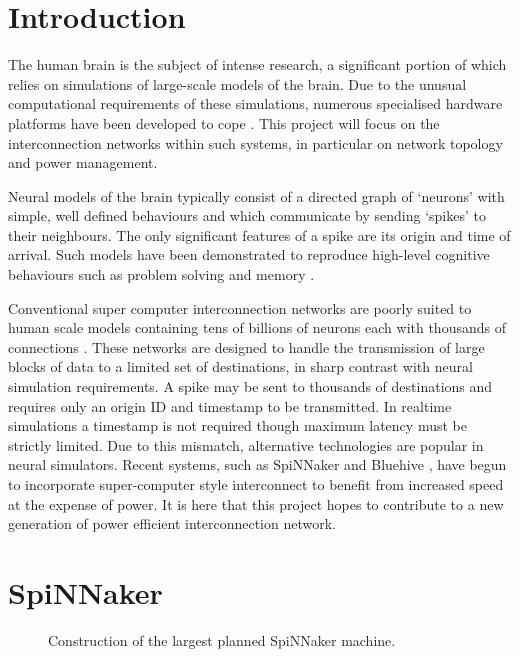 \section{Introduction}

The human brain is the subject of intense research, a significant portion of
which relies on simulations of large-scale models of the brain. Due to the
unusual computational requirements of these simulations, numerous specialised
hardware platforms have been developed to cope
\cite{furber07,moore12,maguire07,choudhary12,misra10}. This project will focus
on the interconnection networks within such systems, in particular on network
topology and power management.

Neural models of the brain typically consist of a directed graph of `neurons'
with simple, well defined behaviours and which communicate by sending `spikes'
to their neighbours. The only significant features of a spike are its origin and
time of arrival. Such models have been demonstrated to reproduce high-level
cognitive behaviours such as problem solving and memory \cite{eliasmith12}. 

Conventional super computer interconnection networks are poorly suited to human
scale models containing tens of billions of neurons \cite{williams88} each with
thousands of connections \cite{kung88}. These networks are designed to handle
the transmission of large blocks of data to a limited set of destinations, in
sharp contrast with neural simulation requirements. A spike may be sent to
thousands of destinations and requires only an origin ID and timestamp to be
transmitted. In realtime simulations a timestamp is not required though maximum
latency must be strictly limited. Due to this mismatch, alternative technologies
are popular in neural simulators. Recent systems, such as SpiNNaker
\cite{furber07} and Bluehive \cite{moore12}, have begun to incorporate
super-computer style interconnect to benefit from increased speed at the expense
of power. It is here that this project hopes to contribute to a new generation
of power efficient interconnection network.

\section{SpiNNaker}
	
	\begin{figure}
		\center
		
		
		\caption{Construction of the largest planned SpiNNaker machine.}
		\label{fig:spinnaker-abstractions}
	\end{figure}
	
